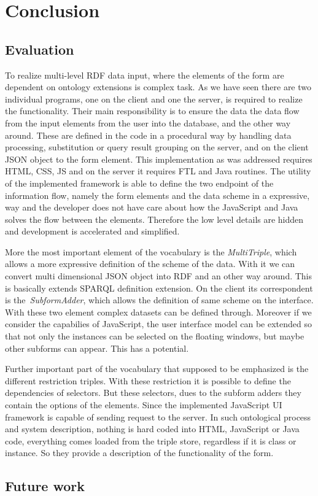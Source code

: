

\chapter{Conclusion}

\section{Evaluation}


To realize multi-level RDF data input, where the elements of the form are dependent on ontology extensions is complex task. As we have seen there are two individual programs, one on the client and one the server, is required to realize the functionality. Their main responsibility is to ensure the data the data flow from the input elements from the user into the database, and the other way around. These are defined in the code in a procedural way by handling data processing, substitution or query result grouping on the server, and on the client JSON object to the form element. This implementation as was addressed requires HTML, CSS, JS and on the server it requires FTL and Java routines. The utility of the implemented framework is able to define the two endpoint of the information flow, namely the form elements and the data scheme in a expressive, way and the developer does not have care about how the JavaScript and Java solves the flow between the elements. Therefore the low level details are hidden and development is accelerated and simplified.

More the most important element of the vocabulary is the \textit{MultiTriple}, which allows a more expressive definition of the scheme of the data. With it we can convert multi dimensional JSON object into RDF and an other way around. This is basically extends SPARQL definition extension. On the client its correspondent is the \textit{SubformAdder}, which allows the definition of same scheme on the interface. With these two element complex datasets can be defined through. Moreover if we consider the capabilies of JavaScript, the user interface model can be extended so that not only the instances can be selected on the floating windows, but maybe other subforms can appear.
This has a potential.
 
Further important part of the vocabulary that supposed to be emphasized is the different restriction triples. With these restriction it is possible to define the dependencies of selectors. But these selectors, dues to the subform adders they contain the options of the elements. Since the implemented JavaScript UI framework is capable of sending request to the server. In such ontological process and system description, nothing is hard coded into HTML, JavaScript or Java code, everything comes loaded from the triple store, regardless if it is class or instance. So they provide a description of the functionality of the form. 


\section{Future work}

